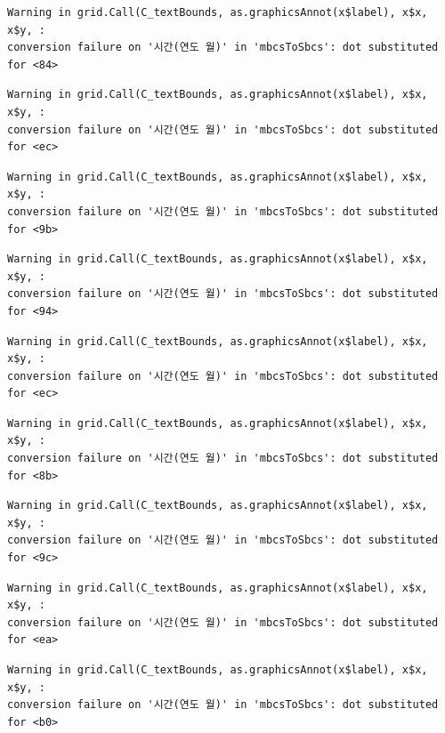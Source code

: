 \documentclass[
  letterpaper,
  DIV=11,
  numbers=noendperiod]{scrreprt}
\begin{document}
\begin{verbatim}
Warning in grid.Call(C_textBounds, as.graphicsAnnot(x$label), x$x, x$y, :
conversion failure on '시간(연도 월)' in 'mbcsToSbcs': dot substituted for <84>
\end{verbatim}

\begin{verbatim}
Warning in grid.Call(C_textBounds, as.graphicsAnnot(x$label), x$x, x$y, :
conversion failure on '시간(연도 월)' in 'mbcsToSbcs': dot substituted for <ec>
\end{verbatim}

\begin{verbatim}
Warning in grid.Call(C_textBounds, as.graphicsAnnot(x$label), x$x, x$y, :
conversion failure on '시간(연도 월)' in 'mbcsToSbcs': dot substituted for <9b>
\end{verbatim}

\begin{verbatim}
Warning in grid.Call(C_textBounds, as.graphicsAnnot(x$label), x$x, x$y, :
conversion failure on '시간(연도 월)' in 'mbcsToSbcs': dot substituted for <94>
\end{verbatim}

\begin{verbatim}
Warning in grid.Call(C_textBounds, as.graphicsAnnot(x$label), x$x, x$y, :
conversion failure on '시간(연도 월)' in 'mbcsToSbcs': dot substituted for <ec>
\end{verbatim}

\begin{verbatim}
Warning in grid.Call(C_textBounds, as.graphicsAnnot(x$label), x$x, x$y, :
conversion failure on '시간(연도 월)' in 'mbcsToSbcs': dot substituted for <8b>
\end{verbatim}

\begin{verbatim}
Warning in grid.Call(C_textBounds, as.graphicsAnnot(x$label), x$x, x$y, :
conversion failure on '시간(연도 월)' in 'mbcsToSbcs': dot substituted for <9c>
\end{verbatim}

\begin{verbatim}
Warning in grid.Call(C_textBounds, as.graphicsAnnot(x$label), x$x, x$y, :
conversion failure on '시간(연도 월)' in 'mbcsToSbcs': dot substituted for <ea>
\end{verbatim}

\begin{verbatim}
Warning in grid.Call(C_textBounds, as.graphicsAnnot(x$label), x$x, x$y, :
conversion failure on '시간(연도 월)' in 'mbcsToSbcs': dot substituted for <b0>
\end{verbatim}
\end{document}
